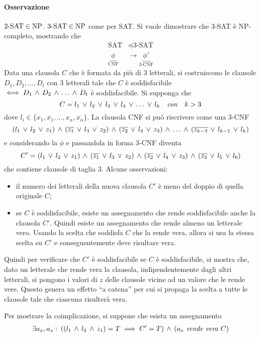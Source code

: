 \paragraph{Osservazione} $\text{2-SAT}\in\text{NP}$.
$\text{3-SAT}\in\text{NP}$ come per SAT. Si vuole dimostrare che 3-SAT è NP-completo, mostrando che 
\begin{align*}
	\text{SAT}&\preceq\text{3-SAT}\\
	\underbracket{\phi}_{\text{CNF}}&\rightarrow\underbracket{\phi'}_{\text{3-CNF}}
\end{align*}
Data una clausola $C$ che è formata da più di 3 letterali, si costruiscono le clausole $D_1,D_2,\dots,D_t$ con 3 letterali tale che $C$ è soddisfacibile $\iff D_1\,\wedge\, D_2\,\wedge\,\dots\,\wedge\, D_t$ è soddisfacibile. Si supponga che \[C=l_1\,\vee\, l_2 \,\vee\, l_3\,\vee\, l_4\,\vee\, \dots\,\vee\, l_k\quad \textit{con}\quad k>3\]
dove $l_i\in\{x_1,\overline{x_1},\dots,x_n,\overline{x_n}\}$. La clausola CNF si può riscrivere come una 3-CNF
\[(l_1\,\vee\, l_2\,\vee\, z_1)\,\wedge\,(\overline{z_1}\,\vee\, l_3\,\vee\, z_2)\,\wedge\, (\overline{z_2}\,\vee\, l_4\,\vee\, z_3)\,\wedge\, \dots\,\wedge\, (\overline{z_{k-3}}\,\vee\, l_{k-1}\,\vee\, l_k)\]
e considerando la $\phi$ e passandola in forma 3-CNF diventa
\[C'=(l_1\,\vee\, l_2\,\vee\, z_1)\,\wedge\,(\overline{z_1}\,\vee\, l_3\,\vee\, z_2)\,\wedge\, (\overline{z_2}\,\vee\, l_4\,\vee\, z_3)\,\wedge\, (\overline{z_3}\,\vee\, l_5\,\vee\, l_6)\]
che contiene clausole di taglia 3. 
Alcune osservazioni:
\begin{itemize}
	\item il numero dei letterali della nuova clausola $C'$ è meno del doppio di quella originale $C$;
	\item se $C$ è soddisfacibile, esiste un assegnamento che rende soddisfacibile anche la clausola $C'$. Quindi esiste un assegnamento che rende almeno un letterale vero. Usando la scelta che soddisfa $C$ che la rende vera, allora si usa la stessa scelta su $C'$ e conseguentemente deve risultare vera. 
\end{itemize}
Quindi per verificare che $C'$ è soddisfacibile se $C$ è soddisfacibile, si mostra che, dato un letterale che rende vera la clausola, indipendentemente dagli altri letterali, si pongono i valori di $z$ delle clausole vicine ad un valore che le rende vere. Questo genera un effetto ``a catena'' per cui si propaga la scelta a tutte le clausole tale che ciascuna risulterà vera.

Per mostrare la coimplicazione, si suppone che esista un assegnamento
\begin{gather*}
	\exists a_x,a_z\,\colon\,  ((l_1\,\wedge\, l_2\,\wedge\, z_1)=T \implies C'=T) \,\wedge\, (a_x\textit{ rende vera } C)
\end{gather*}

